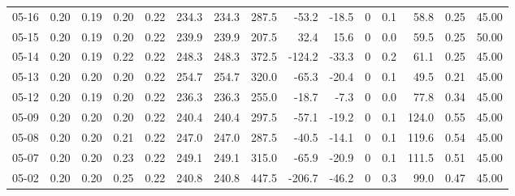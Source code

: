 \begin{threeparttable}
{\begin{tabular}{lrrrrrrrrrrrrrr}
  05-16 &          0.20 &          0.19 &          0.20 &        0.22 &               234.3 &              234.3 &               287.5 &      -53.2 &        -18.5 &              0 &                 0.1 &             58.8 &            0.25 &                  45.00 \\
  05-15 &          0.20 &          0.19 &          0.20 &        0.22 &               239.9 &              239.9 &               207.5 &       32.4 &         15.6 &              0 &                 0.0 &             59.5 &            0.25 &                  50.00 \\
  05-14 &          0.20 &          0.19 &          0.22 &        0.22 &               248.3 &              248.3 &               372.5 &     -124.2 &        -33.3 &              0 &                 0.2 &             61.1 &            0.25 &                  45.00 \\
  05-13 &          0.20 &          0.20 &          0.20 &        0.22 &               254.7 &              254.7 &               320.0 &      -65.3 &        -20.4 &              0 &                 0.1 &             49.5 &            0.21 &                  45.00 \\
  05-12 &          0.20 &          0.19 &          0.20 &        0.22 &               236.3 &              236.3 &               255.0 &      -18.7 &         -7.3 &              0 &                 0.0 &             77.8 &            0.34 &                  45.00 \\
  05-09 &          0.20 &          0.20 &          0.20 &        0.22 &               240.4 &              240.4 &               297.5 &      -57.1 &        -19.2 &              0 &                 0.1 &            124.0 &            0.55 &                  45.00 \\
  05-08 &          0.20 &          0.20 &          0.21 &        0.22 &               247.0 &              247.0 &               287.5 &      -40.5 &        -14.1 &              0 &                 0.1 &            119.6 &            0.54 &                  45.00 \\
  05-07 &          0.20 &          0.20 &          0.23 &        0.22 &               249.1 &              249.1 &               315.0 &      -65.9 &        -20.9 &              0 &                 0.1 &            111.5 &            0.51 &                  45.00 \\
  05-02 &          0.20 &          0.20 &          0.25 &        0.22 &               240.8 &              240.8 &               447.5 &     -206.7 &        -46.2 &              0 &                 0.3 &             99.0 &            0.47 &                  45.00 \\

\end{tabular}}
\end{threeparttable}
